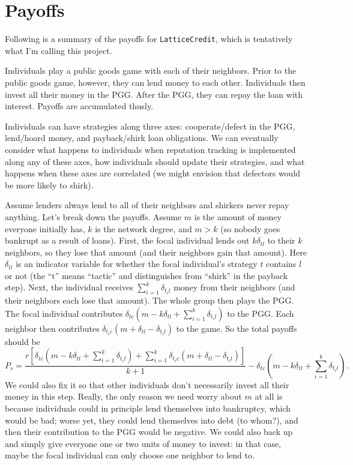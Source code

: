 \documentclass[14pt, a4paper, justified]{article}
\begin{document}
\section*{Payoffs}

Following is a summary of the payoffs for \texttt{LatticeCredit}, which is tentatively what I'm calling this project.

Individuals play a public goods game with each of their neighbors.
Prior to the public goods game, however, they can lend money to each other.
Individuals then invest all their money in the PGG.
After the PGG, they can repay the loan with interest.
Payoffs are accumulated thusly.

Individuals can have strategies along three axes: cooperate/defect in the PGG, lend/hoard money, and payback/shirk loan obligations.
We can eventually consider what happens to individuals when reputation tracking is implemented along any of these axes, how individuals should update their strategies, and what happens when these axes are correlated (we might envision that defectors would be more likely to shirk).

Assume lenders always lend to all of their neighbors and shirkers never repay anything.
Let's break down the payoffs.
Assume $m$ is the amount of money everyone initially has, $k$ is the network degree, and $m > k$ (so nobody goes bankrupt as a result of loans).
First, the focal individual lends out $k\delta_{tl}$ to their $k$ neighbors, so they lose that amount (and their neighbors gain that amount).
Here $\delta_{tl}$ is an indicator variable for whether the focal individual's strategy $t$ contains $l$ or not (the ``t'' means ``tactic'' and distinguishes from ``shirk'' in the payback step).
Next, the individual receives $\sum_{i=1}^k \delta_{t_i l}$ money from their neighbors (and their neighbors each lose that amount).
The whole group then plays the PGG.
The focal individual contributes $\delta_{tc} (m - k\delta_{tl} + \sum_{i=1}^k \delta_{t_i l})$ to the PGG.
Each neighbor then contributes $\delta_{t_i c} (m + \delta_{tl} - \delta_{t_i l})$ to the game.
So the total payoffs should be
\begin{equation}
    P_s = \frac{r[\delta_{tc}(m - k\delta_{tl} + \sum_{i=1}^k \delta_{t_i l}) + \sum_{i=1}^k \delta_{t_i c} (m + \delta_{tl} - \delta_{t_i l})]}{k+1} - \delta_{tc}(m - k\delta_{tl} + \sum_{i=1}^k \delta_{t_i l}).
\end{equation}
We could also fix it so that other individuals don't necessarily invest all their money in this step.
Really, the only reason we need worry about $m$ at all is because individuals could in principle lend themselves into bankruptcy, which would be bad; worse yet, they could lend themselves into debt (to whom?), and then their contribution to the PGG would be negative.
We could also back up and simply give everyone one or two units of money to invest: in that case, maybe the focal individual can only choose one neighbor to lend to.
\end{document}
